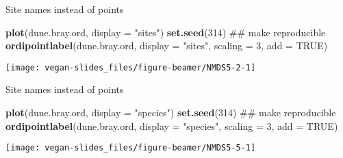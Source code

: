 \documentclass[10pt,ignorenonframetext,compress, aspectratio=169]{beamer}
\newenvironment{Shaded}{\begin{snugshade}}{\end{snugshade}}
\newcommand{\KeywordTok}[1]{\textcolor[rgb]{0.13,0.29,0.53}{\textbf{{#1}}}}
\newcommand{\DataTypeTok}[1]{\textcolor[rgb]{0.13,0.29,0.53}{{#1}}}
\newcommand{\DecValTok}[1]{\textcolor[rgb]{0.00,0.00,0.81}{{#1}}}
\newcommand{\StringTok}[1]{\textcolor[rgb]{0.31,0.60,0.02}{{#1}}}
\newcommand{\OtherTok}[1]{\textcolor[rgb]{0.56,0.35,0.01}{{#1}}}
\newcommand{\NormalTok}[1]{{#1}}
\begin{document}
\begin{frame}[fragile]{Site names instead of points}

\scriptsize

\begin{Shaded}
\begin{Highlighting}[]
\KeywordTok{plot}\NormalTok{(dune.bray.ord, }\DataTypeTok{display =} \StringTok{"sites"}\NormalTok{)}
\KeywordTok{set.seed}\NormalTok{(}\DecValTok{314}\NormalTok{) ## make reproducible}
\KeywordTok{ordipointlabel}\NormalTok{(dune.bray.ord, }\DataTypeTok{display =} \StringTok{"sites"}\NormalTok{, }\DataTypeTok{scaling =} \DecValTok{3}\NormalTok{, }\DataTypeTok{add =} \OtherTok{TRUE}\NormalTok{)}
\end{Highlighting}
\end{Shaded}

\begin{center}\texttt{[image: vegan-slides\_files/figure-beamer/NMDS5-2-1]} \end{center}

\normalsize

\end{frame}

\begin{frame}[fragile]{Site names instead of points}

\scriptsize

\begin{Shaded}
\begin{Highlighting}[]
\KeywordTok{plot}\NormalTok{(dune.bray.ord, }\DataTypeTok{display =} \StringTok{"species"}\NormalTok{)}
\KeywordTok{set.seed}\NormalTok{(}\DecValTok{314}\NormalTok{) ## make reproducible}
\KeywordTok{ordipointlabel}\NormalTok{(dune.bray.ord, }\DataTypeTok{display =} \StringTok{"species"}\NormalTok{, }\DataTypeTok{scaling =} \DecValTok{3}\NormalTok{, }\DataTypeTok{add =} \OtherTok{TRUE}\NormalTok{)}
\end{Highlighting}
\end{Shaded}

\begin{center}\texttt{[image: vegan-slides\_files/figure-beamer/NMDS5-5-1]} \end{center}

\normalsize

\end{frame}
\end{document}
